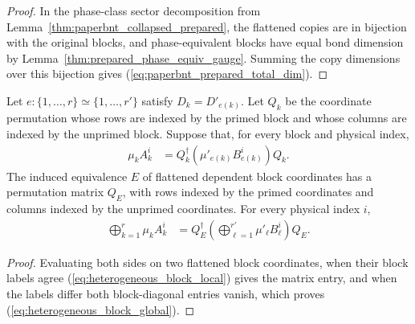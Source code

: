 \begin{proof}\leanok
    In the phase-class sector decomposition from
    Lemma~\ref{thm:paperbnt_collapsed_prepared}, the flattened copies are in
    bijection with the original blocks, and phase-equivalent blocks have equal
    bond dimension by Lemma~\ref{thm:prepared_phase_equiv_gauge}. Summing the
    copy dimensions over this bijection gives
    (\ref{eq:paperbnt_prepared_total_dim}).
\end{proof}

\begin{lemma}%
    \label{thm:heterogeneous_block_sum_reindex}
    \leanok
    Let $e:\{1,\ldots,r\}\simeq\{1,\ldots,r'\}$ satisfy
    $D_k=D'_{e(k)}$. Let $Q_k$ be the coordinate permutation whose rows are
    indexed by the primed block and whose columns are indexed by the unprimed
    block. Suppose that, for every block and physical index,
    \begin{align}
        \mu_kA_k^i
         & =Q_k^\dagger\left(\mu'_{e(k)}B_{e(k)}^i\right)Q_k.
        \label{eq:heterogeneous_block_local}
    \end{align}
    The induced equivalence $E$ of flattened dependent block coordinates has a
    permutation matrix $Q_E$, with rows indexed by the primed coordinates and
    columns indexed by the unprimed coordinates. For every physical index $i$,
    \begin{align}
        \bigoplus_{k=1}^{r}\mu_kA_k^i
         & =Q_E^\dagger\left(\bigoplus_{\ell=1}^{r'}
        \mu'_{\ell}B_{\ell}^i\right)Q_E.
        \label{eq:heterogeneous_block_global}
    \end{align}
\end{lemma}

\begin{proof}\leanok
    Evaluating both sides on two flattened block coordinates, when their block
    labels agree (\ref{eq:heterogeneous_block_local}) gives the matrix entry,
    and when the labels differ both block-diagonal entries vanish, which proves
    (\ref{eq:heterogeneous_block_global}).
\end{proof}

